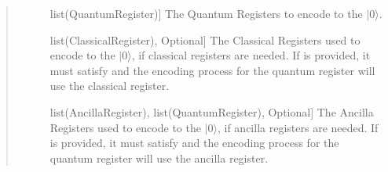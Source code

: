 \documentclass[letterpaper,10pt,english]{sphinxmanual}
\begin{document}
\begin{fulllineitems}
\begin{fulllineitems}
\begin{quote}
\begin{description}
\begin{description}
\item[{}] \leavevmode{[}list(QuantumRegister){]}
\sphinxAtStartPar
The Quantum Registers to encode to the \(|0\rangle\).

\item[{}] \leavevmode{[}list(ClassicalRegister), Optional{]}
\sphinxAtStartPar
The Classical Registers used to encode to the \(|0\rangle\), if classical registers are needed. If  is provided, it must satisfy  and the encoding process for the  quantum register will use the  classical register.

\item[{}] \leavevmode{[}list(AncillaRegister), list(QuantumRegister), Optional{]}
\sphinxAtStartPar
The Ancilla Registers used to encode to the \(|0\rangle\), if ancilla registers are needed. If  is provided, it must satisfy  and the encoding process for the  quantum register will use the  ancilla register.

\end{description}

\end{description}\end{quote}

\end{fulllineitems}


\end{fulllineitems}

\end{document}
